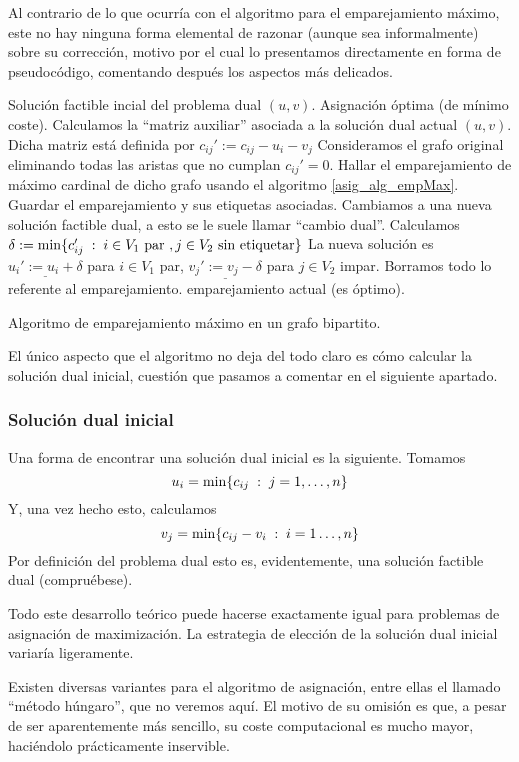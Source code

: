 Al contrario de lo que ocurría con el algoritmo para el emparejamiento máximo, este no hay ninguna forma elemental de razonar (aunque sea informalmente) sobre su corrección, motivo por el cual lo presentamos directamente en forma de pseudocódigo, comentando después los aspectos más delicados.
\begin{algorithm}[H]
	\begin{algorithmic}[1]
		\REQUIRE Solución factible incial del problema dual $(u,v)$.
		\ENSURE Asignación óptima (de mínimo coste).
		\REPEAT
		\STATE Calculamos la ``matriz auxiliar'' asociada a la solución dual actual $(u,v)$.
		\STATE Dicha matriz está definida por $c_{ij}':=c_{ij}-u_i-v_j$
		\STATE Consideramos el grafo original eliminando todas las aristas que no cumplan $c_{ij}'=0$.
		\STATE Hallar el emparejamiento de máximo cardinal de dicho grafo usando el algoritmo \ref{asig_alg_empMax}.
		\STATE Guardar el emparejamiento y sus etiquetas asociadas.
		\STATE Cambiamos a una nueva solución factible dual, a esto se le suele llamar ``cambio dual''.
		\STATE Calculamos $\delta:=\min\{c_{ij}'\;:\; i\in V_1\text{ par },j\in V_2\text{ sin etiquetar}\}$
		\STATE La nueva solución es $\underline{u_i':=u_i+\delta}$ para $i\in V_1$ par, $\underline{v_j':=v_j-\delta}$ para $j\in V_2$ impar.
		\STATE Borramos todo lo referente al emparejamiento.
		\ENDIF
		\RETURN emparejamiento actual (es óptimo).
	\end{algorithmic}
	\caption{Algoritmo de emparejamiento máximo en un grafo bipartito.}\label{asig_alg_asig}
\end{algorithm}
El único aspecto que el algoritmo no deja del todo claro es cómo calcular la solución dual inicial, cuestión que pasamos a comentar en el siguiente apartado.
\subsubsection{Solución dual inicial}
Una forma de encontrar una solución dual inicial es la siguiente. Tomamos
\begin{equation*}
	u_i=\min\{c_{ij}\;:\; j=1,\dots,n\}
\end{equation*}
Y, una vez hecho esto, calculamos
\begin{equation*}
	v_j=\min\{c_{ij}-v_i\;:\; i=1\dots,n\}
\end{equation*}
Por definición del problema dual esto es, evidentemente, una solución factible dual (compruébese).

Todo este desarrollo teórico puede hacerse exactamente igual para problemas de asignación de maximización. La estrategia de elección de la solución dual inicial variaría ligeramente.
\begin{obs}
	Existen diversas variantes para el algoritmo de asignación, entre ellas el llamado ``método húngaro'', que no veremos aquí. El motivo de su omisión es que, a pesar de ser aparentemente más sencillo, su coste computacional es mucho mayor, haciéndolo prácticamente inservible.
\end{obs}

